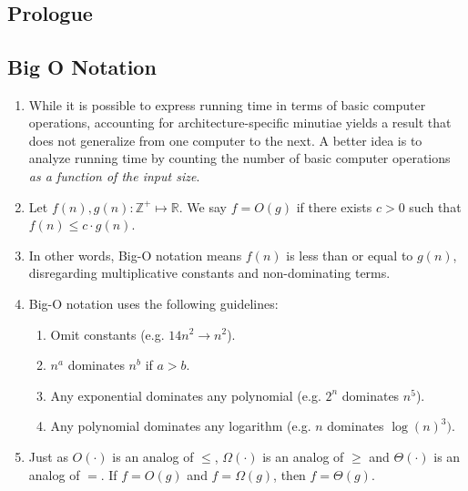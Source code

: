 \documentclass[10pt]{article}
\begin{document}
\date{}
\author{}
\title{\vspace{-5ex}  \vspace{-5ex}}
\maketitle


\begin{multicols}{2}
\section{Prologue}
\begin{addmargin}[0.8em]{0.5em}
    \subsection{Big O Notation}
    \begin{enumerate}[label=(\alph*)]
        \item While it is possible to express running time in terms of basic computer operations, accounting for architecture-specific minutiae yields a result that does not generalize from one computer to the next. A better idea is to analyze running time by counting the number of basic computer operations \textit{as a function of the input size}.
        \item Let $f(n), g(n) : \mathbb{Z^+} \mapsto \mathbb{R}$. We say $f= O(g)$ if there exists $c>0$ such that $f(n) \leq c \cdot g(n)$.
        \item In other words, Big-O notation means $f(n)$ is less than or equal to $g(n)$, disregarding multiplicative constants and non-dominating terms.
        \item Big-O notation uses the following guidelines:
        \begin{enumerate}[label=(\roman*)]
            \item Omit constants (e.g. $14n^2 \rightarrow n^2$).
            \item $n^a$ dominates $n^b$ if $a > b$.
            \item Any exponential dominates any polynomial (e.g. $2^n$ dominates $n^5$).
            \item Any polynomial dominates any logarithm (e.g. $n$ dominates $\log(n)^3)$.
        \end{enumerate}
        \item Just as $O(\cdot)$ is an analog of $\leq$, $\Omega(\cdot)$ is an analog of $\geq$ and $\Theta(\cdot)$ is an analog of $=$. If $f = O(g)$  and $f = \Omega(g)$, then $f = \Theta(g)$.
    \end{enumerate}
    

\end{addmargin}
\end{multicols}
\end{document}
